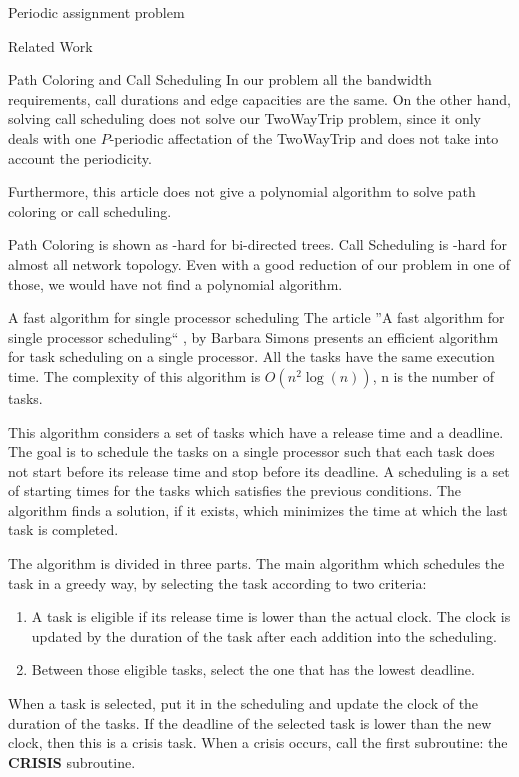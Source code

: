 \documentclass[a4paper,10pt]{report}
\begin{document}
\begin{chapter}{Periodic assignment problem}
\begin{section}{Related Work}
\begin{subsection}{Path Coloring and Call Scheduling}
In our problem all the bandwidth requirements, call durations and edge capacities are the same.
On the other hand, solving call scheduling does not solve our TwoWayTrip problem, since it only deals with one $P$-periodic affectation of the TwoWayTrip and does not take into account the periodicity.

Furthermore, this article does not give a polynomial algorithm to solve path coloring or call scheduling. 

Path Coloring is shown as \NP-hard for bi-directed trees. Call Scheduling is \NP-hard for almost all network topology. Even with a good reduction of our problem in one of those, we would have not find a polynomial algorithm.


\end{subsection}

\begin{subsection}{A fast algorithm for single processor scheduling}
The article ''A fast algorithm for single processor scheduling`` \cite{simons1978fast}, by Barbara Simons presents an efficient algorithm for task 
scheduling on a single processor. All the tasks have the same execution time. The complexity of this algorithm is $O(n^2\log(n))$, n is the number of tasks.

This algorithm considers a set of tasks which have a release time and a deadline. The goal is to schedule the tasks on a single processor such
that each task does not start before its release time and stop before its deadline.
A scheduling is a set of starting times for the tasks which satisfies the previous conditions.
The algorithm finds a solution, if it exists, which minimizes the time at which the last task is completed.

The algorithm is divided in three parts.
The main algorithm which schedules the task in a greedy way, by selecting the task according to two criteria:
\begin{enumerate}
 \item A task is eligible if its release time is lower than the actual clock. The clock is updated by the duration of the task after each addition into the scheduling.
 \item Between those eligible tasks, select the one that has the lowest deadline.
\end{enumerate}

When a task is selected, put it in the scheduling and update the clock of the duration of the tasks.
If the deadline of the selected task is lower than the new clock, then this is a crisis task.
When a crisis occurs, call the first subroutine: the {\bf CRISIS} subroutine.


\end{subsection}
\end{section}
\end{chapter}
\end{document}
